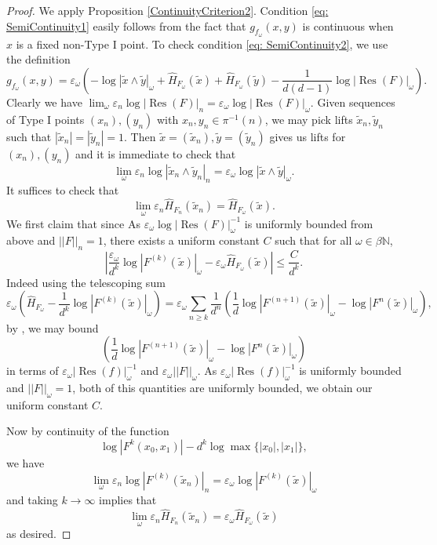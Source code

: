 \documentclass[10pt]{amsart}
\newcommand{\bb}{\mathbb}
\newcommand{\Res}{\operatorname{Res}}
\newcommand{\eps}{\varepsilon}
\newcommand{\Ht}{\widehat{H}}
\numberwithin{theorem}{section}
\numberwithin{example}{section}
\numberwithin{definition}{section}
\begin{document}
\begin{proof}
We apply Proposition \ref{ContinuityCriterion2}. Condition \eqref{eq: SemiContinuity1} easily follows from the fact that $g_{f_{\omega}}(x,y)$ is continuous when $x$ is a fixed non-Type I point. To check condition \eqref{eq: SemiContinuity2}, we use the definition
$$g_{f_{\omega}}(x,y) = \eps_{\omega} \left(-\log |\tilde{x} \wedge \tilde{y}|_{\omega} + \Ht_{F_{\omega}}(\tilde{x}) + \Ht_{F_{\omega}}(\tilde{y}) - \frac{1}{d(d-1)} \log |\Res(F)|_{\omega} \right).$$
Clearly we have $\lim_{\omega} \eps_n \log |\Res(F)|_n = \eps_{\omega} \log |\Res(F)|_{\omega}$. Given sequences of Type I points $(x_n),(y_n)$ with $x_n,y_n \in \pi^{-1}(n)$, we may pick lifts $\tilde{x}_n, \tilde{y}_n$ such that $|\tilde{x}_n| = |\tilde{y}_n| = 1$. Then $\tilde{x} = (\tilde{x}_n), \tilde{y} = (\tilde{y}_n)$ gives us lifts for $(x_n),(y_n)$ and it is immediate to check that 
$$\lim_{\omega} \eps_n \log |\tilde{x}_n \wedge \tilde{y}_n|_n = \eps_{\omega} \log |\tilde{x} \wedge \tilde{y}|_{\omega}.$$
It suffices to check that 
$$\lim_{\omega} \eps_n \Ht_{F_n}(\tilde{x}_n) = \Ht_{F_{\omega}}(\tilde{x}).$$
We first claim that since As $\eps_{\omega} \log |\Res(F)|_{\omega}^{-1}$ is uniformly bounded from above and $||F||_{n} = 1$, there exists a uniform constant $C$ such that for all $\omega \in \beta \bb{N}$,  
$$\left|\frac{\eps_{\omega}}{d^k} \log |F^{(k)}(\tilde{x})|_{\omega} - \eps_{\omega} \Ht_{F_{\omega}}(\tilde{x}) \right| \leq \frac{C}{d^k}.$$
Indeed using the telescoping sum 
$$\eps_{\omega} \left(\Ht_{F_{\omega}} - \frac{1}{d^k} \log |F^{(k)}(\tilde{x})|_{\omega} \right)= \eps_{\omega} \sum_{n \geq k} \frac{1}{d^n} \left(\frac{1}{d} \log |F^{({n+1})}(\tilde{x})|_{\omega} - \log |F^n(\tilde{x})|_{\omega} \right),$$
by \cite[Lemma 5]{Ing22}, we may bound 
$$\left(\frac{1}{d} \log |F^{(n+1)}(\tilde{x})|_{\omega} - \log |F^n(\tilde{x})|_{\omega} \right)$$
in terms of $\eps_{\omega} |\Res(f)|_{\omega}^{-1}$ and $\eps_{\omega} ||F||_{\omega}$. As $\eps_{\omega} |\Res(f)|^{-1}_{\omega}$ is uniformly bounded and $||F||_{\omega} = 1$, both of this quantities are uniformly bounded, we obtain our uniform constant $C$. 
\par 
Now by continuity of the function 
$$\log |F^{k}(x_0,x_1)| - d^k \log \max\{|x_0|,|x_1|\},$$
we have 
$$\lim_{\omega} \eps_n \log |F^{(k)}(\tilde{x}_n)|_n = \eps_{\omega} \log |F^{(k)}(\tilde{x})|_{\omega}$$
and taking $k \to \infty$ implies that 
$$\lim_{\omega} \eps_n \Ht_{F_n}(\tilde{x}_n) = \eps_{\omega} \Ht_{F_{\omega}}(\tilde{x})$$
as desired.
\end{proof}
\end{document}
